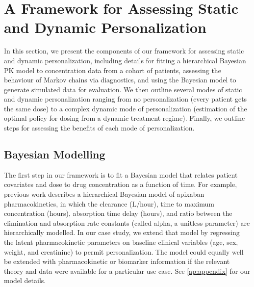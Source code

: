 \section{A Framework for Assessing Static and Dynamic Personalization}\label{ss:framework}

In this section, we present the components of our framework for assessing static and dynamic personalization, including details for fitting a hierarchical Bayesian PK model to concentration data from a cohort of patients, assessing the behaviour of Markov chains via diagnostics, and using the Bayesian model to generate simulated data for evaluation. We then outline several modes of static and dynamic personalization ranging from no personalization (every patient gets the same dose) to a complex dynamic mode of personalization (estimation of the optimal policy for dosing from a dynamic treatment regime).  Finally, we outline steps for assessing the benefits of each mode of personalization.

\subsection{Bayesian Modelling}

The first step in our framework is to fit a Bayesian model that relates patient covariates and dose to drug concentration as a function of time. For example, previous work \cite{pananos2020comparisons} describes a hierarchical Bayesian model of apixaban pharmacokinetics, in which the clearance (L/hour), time to maximum concentration (hours), absorption time delay (hours), and ratio between the elimination and absorption rate constants (called alpha, a unitless parameter) are hierarchically modelled. In our case study, we extend that model by regressing the latent pharmacokinetic parameters on baseline clinical variables (age, sex, weight, and creatinine) to permit personalization. The model could equally well be extended with pharmacokinetic or biomarker information if the relevant theory and data were available for a particular use case. See \cref{ap:appendix} for our model details.

